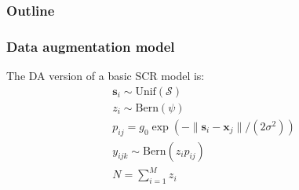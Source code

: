 \documentclass[color=usenames,dvipsnames]{beamer}\usepackage[]{graphicx}\usepackage[]{color}
\newcommand{\bxj}{{\bm x}_j}
\newcommand{\bsi}{{\bm s}_i}
\begin{document}


\begin{frame}
  \frametitle{Outline}
  \Large
  \tableofcontents[currentsection]
\end{frame}





\begin{frame}
  \frametitle{Data augmentation model}
  The DA version of a basic SCR model is:
  \begin{gather*}
    \bsi \sim \mathrm{Unif}(\mathcal{S}) \\
    z_i \sim \mathrm{Bern}(\psi) \\
    p_{ij} = g_0\exp(-\|\bsi-\bxj\|/(2\sigma^2)) \\
    y_{ijk} \sim \mathrm{Bern}(z_i p_{ij}) \\
    N=\sum_{i=1}^M z_i
  \end{gather*}
\end{frame}
\end{document}
